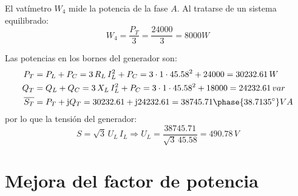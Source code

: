 \begin{example}
El vatímetro $W_4$ mide la potencia de la fase $A$. Al tratarse de un sistema equilibrado:
\begin{equation*}
    W_4=\dfrac{P_T}{3}=\dfrac{24000}{3}=8000W
\end{equation*}

Las potencias en los bornes del generador son:
\begin{align*}
    P_T&=P_L+P_C=3\,R_L\,I_L^2+P_C=3\cdot 1\cdot 45.58^2+24000=30232.61\,W\\
    Q_T&=Q_L+Q_C=3\,X_L\,I_L^2+P_C=3\cdot 1\cdot 45.58^2+18000=24232.61\,var\\
    \overline{S_T}&=P_T+\mathrm{j}Q_T=30232.61+\mathrm{j}24232.61=38745.71\phase{38.7135^\circ} VA
\end{align*}
por lo que la tensión del generador:
\begin{equation*}
    S=\sqrt{3}\,U_L\, I_L\Rightarrow U_L=\dfrac{38745.71}{\sqrt{3}\,45.58}=490.78\,V
\end{equation*}
\end{example}

		\section{Mejora del factor de potencia}
		
		
		
